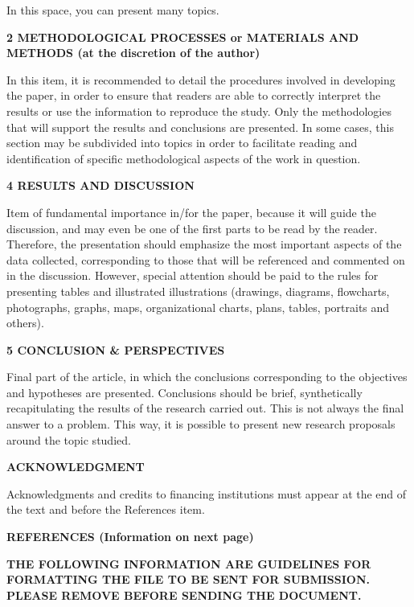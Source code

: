 \documentclass[revista,english,oneside]{ifes8}
\begin{document}
In this space, you can present many topics.

\vspace{4mm}
\noindent\textbf{2 METHODOLOGICAL PROCESSES or MATERIALS AND METHODS (at the discretion
of the author)}

In this item, it is recommended to detail the procedures involved in developing the
paper, in order to ensure that readers are able to correctly interpret the results or
use the information to reproduce the study. Only the methodologies that will support the
results and conclusions are presented. In some cases, this section may be subdivided
into topics in order to facilitate reading and identification of specific methodological
aspects of the work in question.

\vspace{4mm}
\noindent\textbf{4 RESULTS AND DISCUSSION}

Item of fundamental importance in/for the paper, because it will guide the discussion,
and may even be one of the first parts to be read by the reader. Therefore, the
presentation should emphasize the most important aspects of the data collected,
corresponding to those that will be referenced and commented on in the discussion.
However, special attention should be paid to the rules for presenting tables and
illustrated illustrations (drawings, diagrams, flowcharts, photographs, graphs, maps,
organizational charts, plans, tables, portraits and others).

\vspace{4mm}
\noindent\textbf{5 CONCLUSION \& PERSPECTIVES}

Final part of the article, in which the conclusions corresponding to the objectives and
hypotheses are presented. Conclusions should be brief, synthetically recapitulating the
results of the research carried out. This is not always the final answer to a problem.
This way, it is possible to present new research proposals around the topic studied.

\vspace{4mm}
\noindent\textbf{ACKNOWLEDGMENT}

Acknowledgments and credits to financing institutions must appear at the end of the text
and before the References item.

\vspace{4mm}
\noindent\textbf{REFERENCES (Information on next page)}

\newpage
\noindent\textbf{THE FOLLOWING INFORMATION ARE GUIDELINES FOR FORMATTING THE FILE TO BE
SENT FOR SUBMISSION. PLEASE REMOVE BEFORE SENDING THE DOCUMENT.}
\end{document}
